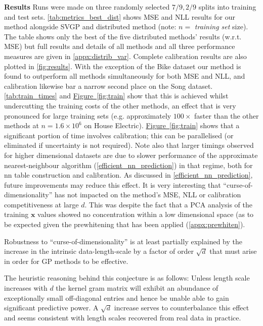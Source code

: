 \textbf{Results}
 Runs were made on three randomly selected $7/9,2/9$ splits into training and test sets. \autoref{tab:metrics_best_dist} shows MSE and NLL results for our method alongside SVGP and distributed method (note: $n=$ {\it training set} size). 
The table shows only the best of the five distributed methods' results (w.r.t. MSE) but full results and details of all methods and all three performance measures are given in \ref{appx:distrib_var}. Complete calibration results are also plotted in \autoref{fig:results}.
With the exception of the Bike dataset our method is found to outperform all methods simultaneously for both MSE and NLL, and calibration likewise bar a narrow second place on the Song dataset. \autoref{tab:train_times} and \hyperref[{fig:train}]{Figure~\ref*{fig:train}} show that this is achieved whilst undercutting the training costs of the other methods, an effect that is very pronounced for large training sets (e.g. approximately $100\times$ faster than the other methods at $n= 1.6 \times 10^6$ on House Electric). \hyperref[{fig:train}]{Figure~\ref*{fig:train}} shows that a significant portion of time involves calibration; this can be parallelised (or eliminated if uncertainty is not required). Note also that larger timings observed for higher dimensional datasets are due to slower performance of the approximate nearest-neighbour algorithm (\ref{efficient_nn_prediction}) in that regime, both for nn table construction and calibration. As discussed in \ref{efficient_nn_prediction}, future improvements may reduce this effect. It is very interesting that ``curse-of-dimensionality'' has not impacted on the method's MSE, NLL or calibration competitiveness at large $d$. This was despite the fact that a PCA analysis of the training $\bm{x}$ values showed no concentration within a low dimensional space (as to be expected given the prewhitening that has been applied  (\autoref{appx:prewhiten}).

\begin{conjecture} 
\label{conj:curse}
Robustness to ``curse-of-dimensionality'' is at least partially explained by the increase in the intrinsic data-length-scale by a factor of order $\sqrt{d}$ that must arise in order for GP methods to be effective.
\end{conjecture}
The heuristic reasoning behind this conjecture is as follows: Unless length scale increases with $d$ the kernel gram matrix will exhibit an abundance of exceptionally small off-diagonal entries and hence be unable able to gain significant predictive power. A $\sqrt{d}$ increase serves to counterbalance this effect and seems consistent with length scales recovered from real data in practice.

